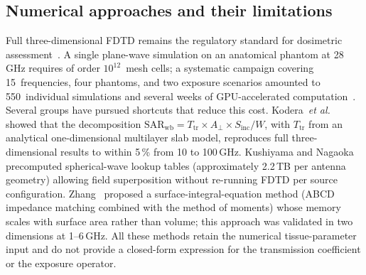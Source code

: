 \documentclass[11pt,a4paper]{article}
\theoremstyle{definition}      %
\newcommand{\Sinc}{S_{\mathrm{inc}}}
\newcommand{\Aperp}{A_{\perp}}
\newcommand{\SARwb}{\mathrm{SAR}_{\mathrm{wb}}}
\begin{document}
\subsection{Numerical approaches and their limitations}

Full three-dimensional FDTD remains the regulatory standard for
dosimetric assessment~\cite{ICNIRP2020,Hirata2021}.
A single plane-wave simulation on an anatomical phantom at 28\,GHz
requires of order $10^{12}$~mesh cells; a systematic campaign
covering 15~frequencies, four phantoms, and two exposure scenarios
amounted to 550~individual simulations and several weeks of
GPU-accelerated computation~\cite{WydaegheEtAl2026PMB}.
Several groups have pursued shortcuts that reduce this cost.
Kodera~\textit{et al.}~\cite{Kodera2024} showed that the
decomposition $\SARwb = T_{\mathrm{tr}} \times \Aperp
\times \Sinc / W$, with $T_{\mathrm{tr}}$ from an analytical
one-dimensional multilayer slab model, reproduces full
three-dimensional results to within 5\,\% from 10 to 100\,GHz.
Kushiyama and Nagaoka~\cite{Kushiyama2025} precomputed spherical-wave
lookup tables (approximately 2.2\,TB per antenna geometry) allowing
field superposition without re-running FDTD per source configuration.
Zhang~\cite{Zhang2017thesis} proposed a surface-integral-equation
method (ABCD impedance matching combined with the method of moments)
whose memory scales with surface area rather than volume; this
approach was validated in two dimensions at 1--6\,GHz.
All these methods retain the numerical tissue-parameter input and do
not provide a closed-form expression for the transmission
coefficient or the exposure operator.


\end{document}
